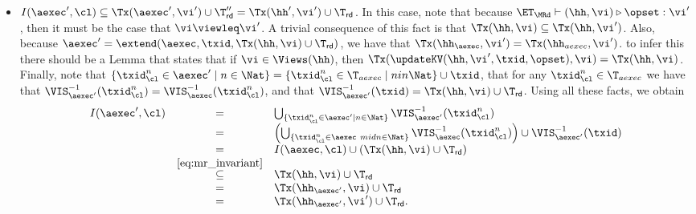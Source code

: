 \begin{example}
\begin{itemize}
\item $I(\aexec', \cl) \subseteq \Tx(\aexec', \vi') \cup \T''_{\mathsf{rd}} = \Tx(\hh', \vi') \cup \T_{\mathsf{rd}}$. 
In this case, note that because $\ET_{\MRd} \vdash (\hh, \vi) \triangleright \opset: \vi'$, then 
it must be the case that $\vi \viewleq \vi'$. A trivial consequence of this fact is that 
$\Tx(\hh, \vi) \subseteq \Tx(\hh, \vi')$. Also, because $\aexec' = \extend(\aexec, \txid, \Tx(\hh, \vi) \cup \T_{\mathsf{rd}})$, 
we have that $\Tx(\hh_{\aexec}, \vi') = \Tx(\hh_{aexec}, \vi')$. {\color{red} to infer this there should 
be a Lemma that states that if $\vi \in \Views(\hh)$, then 
$\Tx(\updateKV(\hh, \vi', \txid, \opset), \vi) = \Tx(\hh, \vi)$.}
Finally, note that $\{\txid_{\cl}^{n} \in \aexec' \mid n \in \Nat\} = 
\{ \txid_{\cl}^{n} \in \T_{aexec} \mid n in \Nat\} \cup \txid$, that for any 
$\txid_{\cl}^{n} \in \T_{aexec}$ we have that $\VIS^{-1}_{\aexec'}(\txid_{\cl}^{n}) = 
\VIS^{-1}_{\aexec}(\txid_{\cl}^{n})$, and that 
$\VIS_{\aexec'}^{-1}(\txid) = \Tx(\hh, \vi) \cup \T_{\mathsf{rd}}$. 
Using all these facts, we obtain 
\[
\begin{array}{lcl}
I(\aexec', \cl) &=& \bigcup_{\{\txid_{\cl}^{n} \in \aexec' \mid n \in \Nat\}} \VIS_{\aexec'}^{-1}(\txid_{\cl}^{n}) \\
&=& \left( \bigcup_{\{\txid_{\cl}^{n} \in \aexec\ mid n \in \Nat\}} \VIS_{\aexec}^{-1}(\txid_{\cl}^{n}) \right) \cup \VIS^{-1}_{\aexec'}(\txid)\\
&=& I(\aexec, \cl) \cup (\Tx(\hh, \vi) \cup \T_{\mathsf{rd}})\\
&\stackrel{\eqref{eq:mr_invariant}}{\subseteq}& \Tx(\hh, \vi) \cup \T_{\mathsf{rd}}\\
&=& \Tx(\hh_{\aexec'}, \vi) \cup \T_{\mathsf{rd}}\\
&=& \Tx(\hh_{\aexec'}, \vi') \cup \T_{\mathsf{rd}}.
\end{array}
\]
\end{itemize}
\end{example}

